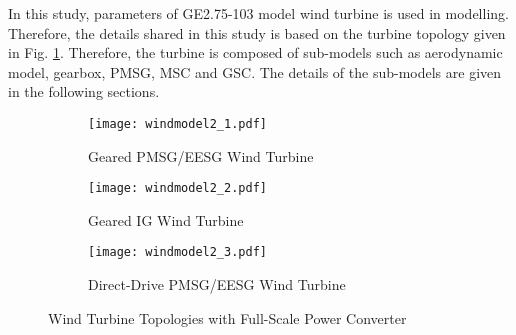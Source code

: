 In this study, parameters of GE2.75-103 model wind turbine is used in modelling. Therefore, the details shared in this study is based on the turbine topology given in Fig. \ref{varspeedpmsg_1}. Therefore, the turbine is composed of sub-models such as aerodynamic model, gearbox, PMSG, MSC and GSC. The details of the sub-models are given in the following sections.\par
\begin{figure}[h!]
	\centering
	\begin{subfigure}{0.9\textwidth} %
		\texttt{[image: windmodel2\_1.pdf]}
		\caption{Geared PMSG/EESG Wind Turbine}		
		\label{varspeedpmsg_1}
	\end{subfigure}
	\vspace{0.1em} %
	\begin{subfigure}{0.9\textwidth}
		\texttt{[image: windmodel2\_2.pdf]}
		\caption{Geared IG Wind Turbine}
		\label{varspeedpmsg_2}	
	\end{subfigure}
	\vspace{0.1em} %
	\begin{subfigure}{0.9\textwidth}
	\texttt{[image: windmodel2\_3.pdf]}
	\caption{Direct-Drive PMSG/EESG Wind Turbine}
	\label{varspeedpmsg_3}	
	\end{subfigure}
	\caption{Wind Turbine Topologies with Full-Scale Power Converter}
	\label{varspeedpmsg_4}
\end{figure}
